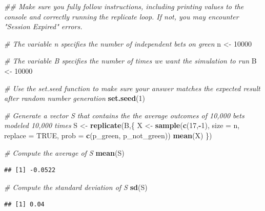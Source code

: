 \documentclass[
]{article}
\newenvironment{Shaded}{\begin{snugshade}}{\end{snugshade}}
\newcommand{\CommentTok}[1]{\textcolor[rgb]{0.56,0.35,0.01}{\textit{#1}}}
\newcommand{\DataTypeTok}[1]{\textcolor[rgb]{0.13,0.29,0.53}{#1}}
\newcommand{\DecValTok}[1]{\textcolor[rgb]{0.00,0.00,0.81}{#1}}
\newcommand{\KeywordTok}[1]{\textcolor[rgb]{0.13,0.29,0.53}{\textbf{#1}}}
\newcommand{\NormalTok}[1]{#1}
\newcommand{\OperatorTok}[1]{\textcolor[rgb]{0.81,0.36,0.00}{\textbf{#1}}}
\newcommand{\OtherTok}[1]{\textcolor[rgb]{0.56,0.35,0.01}{#1}}
\newcommand{\StringTok}[1]{\textcolor[rgb]{0.31,0.60,0.02}{#1}}
\begin{document}
\begin{Shaded}
\begin{Highlighting}[]
\CommentTok{\#\# Make sure you fully follow instructions, including printing values to the console and correctly running the \textasciigrave{}replicate\textasciigrave{} loop. If not, you may encounter "Session Expired" errors.}

\CommentTok{\# The variable \textasciigrave{}n\textasciigrave{} specifies the number of independent bets on green}
\NormalTok{n \textless{}{-}}\StringTok{ }\DecValTok{10000}

\CommentTok{\# The variable \textasciigrave{}B\textasciigrave{} specifies the number of times we want the simulation to run}
\NormalTok{B \textless{}{-}}\StringTok{ }\DecValTok{10000}

\CommentTok{\# Use the \textasciigrave{}set.seed\textasciigrave{} function to make sure your answer matches the expected result after random number generation}
\KeywordTok{set.seed}\NormalTok{(}\DecValTok{1}\NormalTok{)}

\CommentTok{\# Generate a vector \textasciigrave{}S\textasciigrave{} that contains the the average outcomes of 10,000 bets modeled 10,000 times}
\NormalTok{S \textless{}{-}}\StringTok{ }\KeywordTok{replicate}\NormalTok{(B,\{  }
\NormalTok{  X \textless{}{-}}\StringTok{ }\KeywordTok{sample}\NormalTok{(}\KeywordTok{c}\NormalTok{(}\DecValTok{17}\NormalTok{,}\OperatorTok{{-}}\DecValTok{1}\NormalTok{), }\DataTypeTok{size =}\NormalTok{ n, }\DataTypeTok{replace =} \OtherTok{TRUE}\NormalTok{, }\DataTypeTok{prob =} \KeywordTok{c}\NormalTok{(p\_green, p\_not\_green))}
  \KeywordTok{mean}\NormalTok{(X)}
\NormalTok{\})}

\CommentTok{\# Compute the average of \textasciigrave{}S\textasciigrave{}}
\KeywordTok{mean}\NormalTok{(S)}
\end{Highlighting}
\end{Shaded}

\begin{verbatim}
## [1] -0.0522
\end{verbatim}

\begin{Shaded}
\begin{Highlighting}[]
\CommentTok{\# Compute the standard deviation of \textasciigrave{}S\textasciigrave{}}
\KeywordTok{sd}\NormalTok{(S)}
\end{Highlighting}
\end{Shaded}

\begin{verbatim}
## [1] 0.04
\end{verbatim}
\end{document}
